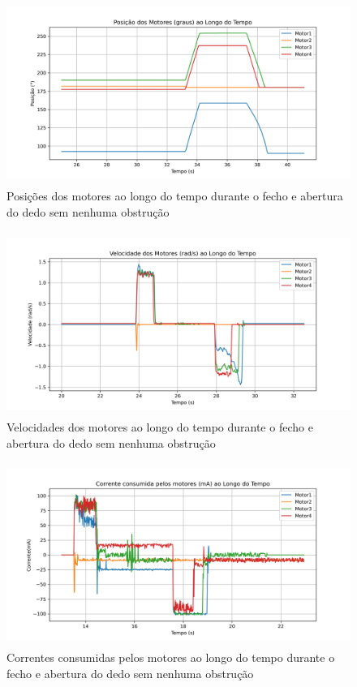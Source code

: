 \begin{figure}[H]
    \centering
    \includegraphics[height=6cm]{figs/chapter4/finger_positions.png}
    \caption{Posições dos motores ao longo do tempo durante o fecho e abertura do dedo sem nenhuma obstrução}
    \label{fig:pos}
    
\end{figure}
\begin{figure}[H]
    \centering
    \includegraphics[height=6cm]{figs/chapter4/finger_velocities.png}
    \caption{Velocidades dos motores ao longo do tempo durante o fecho e abertura do dedo sem nenhuma obstrução}
    \label{fig:vels}
    
\end{figure}
\begin{figure}[H]
    \centering
    \includegraphics[height=6cm]{figs/chapter4/finger_currents.png}
    \caption{Correntes consumidas pelos motores ao longo do tempo durante o fecho e abertura do dedo sem nenhuma obstrução}
    \label{fig:currs}
    
\end{figure}


